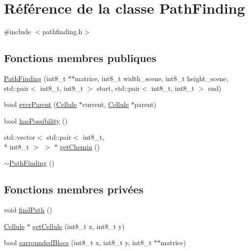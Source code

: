 \hypertarget{classPathFinding}{\section{Référence de la classe Path\-Finding}
\label{classPathFinding}
}


{\ttfamily \#include $<$pathfinding.\-h$>$}

\subsection*{Fonctions membres publiques}
\begin{DoxyCompactItemize}
\item 
\hyperlink{classPathFinding_aff5b197409e0489e6df3c2366ee6f8cd}{Path\-Finding} (int8\-\_\-t $\ast$$\ast$matrice, int8\-\_\-t width\-\_\-scene, int8\-\_\-t height\-\_\-scene, std\-::pair$<$ int8\-\_\-t, int8\-\_\-t $>$ start, std\-::pair$<$ int8\-\_\-t, int8\-\_\-t $>$ end)
\item 
bool \hyperlink{classPathFinding_a2cb53ee646709c2367a6819d758ec7c3}{ever\-Parent} (\hyperlink{classCellule}{Cellule} $\ast$current, \hyperlink{classCellule}{Cellule} $\ast$parent)
\item 
bool \hyperlink{classPathFinding_a8d70d17f06400cdcd5787331d7be38e2}{has\-Possibility} ()
\item 
std\-::vector$<$ std\-::pair$<$ int8\-\_\-t, \\*
int8\-\_\-t $>$ $>$ $\ast$ \hyperlink{classPathFinding_aff1ca43a0ea5e4b9e5e188f165f08cd2}{get\-Chemin} ()
\item 
\hyperlink{classPathFinding_a0fc7389a32fa31a194a940a89f252bdb}{$\sim$\-Path\-Finding} ()
\end{DoxyCompactItemize}
\subsection*{Fonctions membres privées}
\begin{DoxyCompactItemize}
\item 
void \hyperlink{classPathFinding_addc7b9eb5682e0de46fd59c4a1319a86}{find\-Path} ()
\item 
\hyperlink{classCellule}{Cellule} $\ast$ \hyperlink{classPathFinding_a3817cc8f9d1604bf34a5a3b4f878b3da}{get\-Cellule} (int8\-\_\-t x, int8\-\_\-t y)
\item 
bool \hyperlink{classPathFinding_ad85b700719e73736e36d2548f950323a}{surrounded\-Blocs} (int8\-\_\-t x, int8\-\_\-t y, int8\-\_\-t $\ast$$\ast$matrice)
\end{DoxyCompactItemize}
